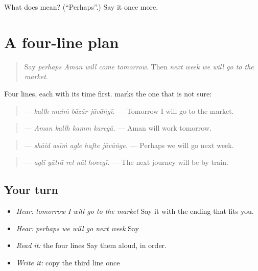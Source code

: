 \begin{tcolorbox}[breakable,colback=teal!4,colframe=teal!35!black,title={Before you move on}]
What does \textbf{} mean? (\textquotedblleft{}Perhaps\textquotedblright{}.) Say it once more.
\end{tcolorbox}
\section[\texorpdfstring{\pa{ਸ਼ਾਇਦ} \pa{ਅਸੀਂ} \pa{ਅਗਲੇ} \pa{ਹਫ਼ਤੇ} … (shāid asīṁ agle …)}{ਸ਼ਾਇਦ ਅਸੀਂ ਅਗਲੇ ਹਫ਼ਤੇ … (shāid asīṁ agle …)}]{A four-line plan}

\label{lesson:PA-C223-spoken-plan}



\begin{quote}
Say \emph{perhaps Aman will come tomorrow}. Then \emph{next week we will go to the market}.
\end{quote}

\begin{grammarlens}[title={Grammar Lens: sure, and perhaps}]
Four lines, each with its time first. \textbf{} marks the one that is not sure:

\begin{quote}
\textbf{   } — \emph{kallh maiṁ bāzār jāvāṅgī.} — Tomorrow I will go to the market.
\end{quote}

\begin{quote}
\textbf{   } — \emph{Aman kallh kamm karegā.} — Aman will work tomorrow.
\end{quote}

\begin{quote}
\textbf{    } — \emph{shāid asīṁ agle hafte jāvāṅge.} — Perhaps we will go next week.
\end{quote}

\begin{quote}
\textbf{    } — \emph{aglī yātrā rel nāl hovegī.} — The next journey will be by train.
\end{quote}
\end{grammarlens}

\subsection*{Your turn}
\begin{itemize}
\raggedright
  \item \emph{Hear:} \emph{tomorrow I will go to the market} Say it with the ending that fits you.
  \item \emph{Hear:} \emph{perhaps we will go next week} Say \textbf{    }
  \item \emph{Read it:} the four lines Say them aloud, in order.
  \item \emph{Write it:} copy the third line once
\end{itemize}

